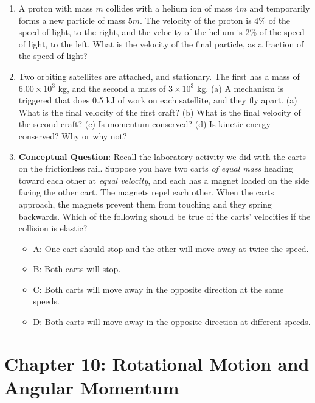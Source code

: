 \documentclass[10pt]{article}
\begin{document}
\begin{enumerate}
\item A proton with mass $m$ collides with a helium ion of mass $4m$ and temporarily forms a new particle of mass $5m$.  The velocity of the proton is 4\% of the speed of light, to the right, and the velocity of the helium is 2\% of the speed of light, to the left.  What is the velocity of the final particle, as a fraction of the speed of light? \\ \vspace{1.5cm}
\item Two orbiting satellites are attached, and stationary. The first has a mass of $6.00 \times 10^3$ kg, and the second a mass of $3 \times 10^3$ kg. (a) A mechanism is triggered that does 0.5 kJ of work on each satellite, and they fly apart. (a) What is the final velocity of the first craft?  (b) What is the final velocity of the second craft? (c) Is momentum conserved? (d) Is kinetic energy conserved?  Why or why not? \\ \vspace{3cm}
\item \textbf{Conceptual Question}: Recall the laboratory activity we did with the carts on the frictionless rail.  Suppose you have two carts \textit{of equal mass} heading toward each other at \textit{equal velocity}, and each has a magnet loaded on the side facing the other cart.  The magnets repel each other.  When the carts approach, the magnets prevent them from touching and they spring backwards.  Which of the following should be true of the carts' velocities if the collision is elastic?
\begin{itemize}
\item A: One cart should stop and the other will move away at twice the speed. 
\item B: Both carts will stop.
\item C: Both carts will move away in the opposite direction at the same speeds.
\item D: Both carts will move away in the opposite direction at different speeds.
\end{itemize}
\end{enumerate}

\section{Chapter 10: Rotational Motion and Angular Momentum}
\end{document}
